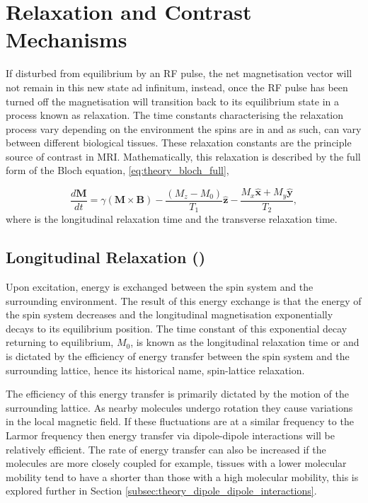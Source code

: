 \section{Relaxation and Contrast Mechanisms}
If disturbed from equilibrium by an \ac{RF} pulse, the net magnetisation vector will not remain in this new state ad infinitum, instead, once the \ac{RF} pulse has been turned off the magnetisation will transition back to its equilibrium state in a process known as relaxation. The time constants characterising the relaxation process vary depending on the environment the spins are in and as such, can vary between different biological tissues. These relaxation constants are the principle source of contrast in \ac{MRI}. Mathematically, this relaxation is described by the full form of the Bloch equation, \eqref{eq:theory_bloch_full},

\begin{equation}
\frac{d\mathbf{M}}{dt} = \gamma \left( \mathbf{M \times B} \right) - \frac{\left( M_z - M_0 \right)}{T_1}\mathbf{\hat{z}} - \frac{M_x \mathbf{\hat{x}} + M_y \mathbf{\hat{y}}}{T_2},
\label{eq:theory_bloch_full}
\end{equation}
where \tone is the longitudinal relaxation time and \ttwo the transverse relaxation time.

\subsection{Longitudinal Relaxation (\tone)}
\label{subsec:theory_t1}
Upon excitation, energy is exchanged between the spin system and the surrounding environment. The result of this energy exchange is that the energy of the spin system decreases and the longitudinal magnetisation exponentially decays to its equilibrium position. The time constant of this exponential decay returning to equilibrium, $M_0$, is known as the longitudinal relaxation time or \tone and is dictated by the efficiency of energy transfer between the spin system and the surrounding lattice, hence its historical name, spin-lattice relaxation.

The efficiency of this energy transfer is primarily dictated by the motion of the surrounding lattice. As nearby molecules undergo rotation they cause variations in the local magnetic field. If these fluctuations are at a similar frequency to the Larmor frequency then energy transfer via dipole-dipole interactions will be relatively efficient. The rate of energy transfer can also be increased if the molecules are more closely coupled for example, tissues with a lower molecular mobility tend to have a shorter \tone than those with a high molecular mobility, this is explored further in Section \ref{subsec:theory_dipole_dipole_interactions}.

